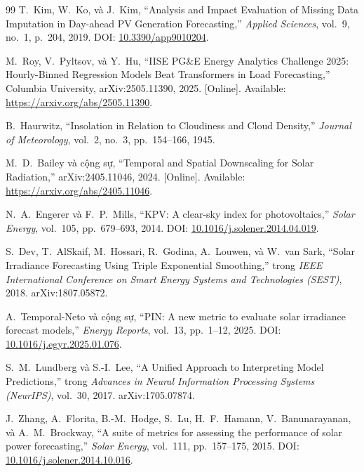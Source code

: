 \documentclass[12pt, a4paper]{report}
\begin{document}
\begin{thebibliography}{99}
T.~Kim, W.~Ko, và J.~Kim,
\newblock ``Analysis and Impact Evaluation of Missing Data Imputation in Day-ahead PV Generation Forecasting,''
\newblock \textit{Applied Sciences}, vol.~9, no.~1, p.~204, 2019.
\newblock DOI: \href{https://doi.org/10.3390/app9010204}{10.3390/app9010204}.

M.~Roy, V.~Pyltsov, và Y.~Hu,
\newblock ``IISE PG\&E Energy Analytics Challenge 2025: Hourly-Binned Regression Models Beat Transformers in Load Forecasting,''
\newblock Columbia University, arXiv:2505.11390, 2025. [Online]. Available: \url{https://arxiv.org/abs/2505.11390}.

B.~Haurwitz,
\newblock ``Insolation in Relation to Cloudiness and Cloud Density,''
\newblock \textit{Journal of Meteorology}, vol.~2, no.~3, pp.~154--166, 1945.

M.~D.~Bailey và cộng sự,
\newblock ``Temporal and Spatial Downscaling for Solar Radiation,''
\newblock arXiv:2405.11046, 2024. [Online]. Available: \url{https://arxiv.org/abs/2405.11046}.

N.~A.~Engerer và F.~P.~Mills,
\newblock ``KPV: A clear-sky index for photovoltaics,''
\newblock \textit{Solar Energy}, vol.~105, pp.~679--693, 2014.
\newblock DOI: \href{https://doi.org/10.1016/j.solener.2014.04.019}{10.1016/j.solener.2014.04.019}.

S.~Dev, T.~AlSkaif, M.~Hossari, R.~Godina, A.~Louwen, và W.~van Sark,
\newblock ``Solar Irradiance Forecasting Using Triple Exponential Smoothing,''
\newblock trong \textit{IEEE International Conference on Smart Energy Systems and Technologies (SEST)}, 2018.
\newblock arXiv:1807.05872.

A.~Temporal-Neto và cộng sự,
\newblock ``PIN: A new metric to evaluate solar irradiance forecast models,''
\newblock \textit{Energy Reports}, vol.~13, pp.~1--12, 2025.
\newblock DOI: \href{https://doi.org/10.1016/j.egyr.2025.01.076}{10.1016/j.egyr.2025.01.076}.

S.~M.~Lundberg và S.-I.~Lee,
\newblock ``A Unified Approach to Interpreting Model Predictions,''
\newblock trong \textit{Advances in Neural Information Processing Systems (NeurIPS)}, vol.~30, 2017.
\newblock arXiv:1705.07874.

J.~Zhang, A.~Florita, B.-M.~Hodge, S.~Lu, H.~F.~Hamann, V.~Banunarayanan, và A.~M.~Brockway,
\newblock ``A suite of metrics for assessing the performance of solar power forecasting,''
\newblock \textit{Solar Energy}, vol.~111, pp.~157--175, 2015.
\newblock DOI: \href{https://doi.org/10.1016/j.solener.2014.10.016}{10.1016/j.solener.2014.10.016}.


\end{thebibliography}
\end{document}
